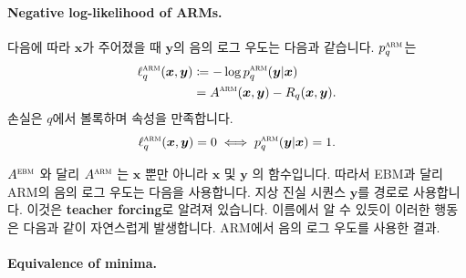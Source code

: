 \documentclass{article}
\def\x{{\bm{x}}}
\def\y{{\bm{y}}}
\newcommand{\Qsub}[1]{R_{#1}}
\def\arm{{\textsc{arm}}}
\def\ebm{{\textsc{ebm}}}
\begin{document}
\paragraph{Negative log-likelihood of ARMs.}

다음에 따라 $\x$가 주어졌을 때 $\y$의 음의 로그 우도는 다음과 같습니다.
 $p^\arm_q$는
 \begin{align} 
 \ell ^ \arm _q( \x , \y )
& \coloneqq - \log p^ \arm _q( \y | \x ) \\
&= A^ \arm ( \x , \y ) - \Qsub{q} ( \x , \y ).
 \end{align} 
손실은 $q$에서 볼록하며 속성을 만족합니다.
 \begin{equation} 
 \ell ^ \arm _q( \x , \y ) = 0 \iff p^ \arm _q( \y | \x ) = 1.
 \end{equation}

$A^\ebm$ 와 달리 $A^\arm$ 는 $\x$ 뿐만 아니라 $\x$ 및 $\y$ 의 함수입니다.
따라서 EBM과 달리 ARM의 음의 로그 우도는 다음을 사용합니다.
지상 진실 시퀀스 $\y$를 경로로 사용합니다. 이것은 \textbf{teacher
forcing}로 알려져 있습니다. 이름에서 알 수 있듯이 이러한 행동은 다음과 같이 자연스럽게 발생합니다.
ARM에서 음의 로그 우도를 사용한 결과.

\paragraph{Equivalence of minima.}
\end{document}
